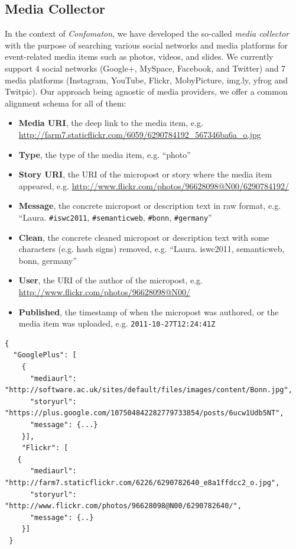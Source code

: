 \subsection{Media Collector}                                                \label{sec:media-collector}
In the context of \emph{Confomaton}, we have developed the so-called \emph{media collector} with the purpose of searching various social networks and media platforms for event-related media items such as photos, videos, and slides. We currently support 4 social networks (Google+, MySpace, Facebook, and Twitter) and 7 media platforms (Instagram, YouTube, Flickr, MobyPicture, img.ly, yfrog and Twitpic). Our approach being agnostic of media providers, we offer a common alignment schema for all of them:
\begin{itemize}
  \item	\textbf{Media URI}, the deep link to the media item, e.g. \url{http://farm7.staticflickr.com/6059/6290784192_567346ba6a_o.jpg}
  \item \textbf{Type}, the type of the media item, e.g.  ``photo''
  \item \textbf{Story URI}, the URI of the micropost or story where the media item appeared, e.g. \url{http://www.flickr.com/photos/96628098@N00/6290784192/}
  \item \textbf{Message}, the concrete micropost or description text in raw format, e.g.  ``Laura. \texttt{\#iswc2011}, \texttt{\#semanticweb}, \texttt{\#bonn}, \texttt{\#germany}''
  \item \textbf{Clean}, the concrete cleaned micropost or description text with some characters (e.g. hash signs) removed, e.g. ``Laura. iswc2011, semanticweb, bonn, germany''
  \item \textbf{User}, the URI of the author of the micropost, e.g. \url{http://www.flickr.com/photos/96628098@N00/}
  \item \textbf{Published}, the timestamp of when the micropost was authored, or the media item was uploaded, e.g. \texttt{2011-10-27T12:24:41Z}
\end{itemize}

\begin{lstlisting}[caption={Sample output of the media collector showing Google+ and Flickr results using \#iswc2011 as query term},label={lst:media}]
{
  "GooglePlus": [
    {
	  "mediaurl": "http://software.ac.uk/sites/default/files/images/content/Bonn.jpg",
	  "storyurl": "https://plus.google.com/107504842282779733854/posts/6ucw1Udb5NT",
	  "message": {...}
    }],
    "Flickr": [
   {
      "mediaurl": "http://farm7.staticflickr.com/6226/6290782640_e8a1ffdcc2_o.jpg",
      "storyurl": "http://www.flickr.com/photos/96628098@N00/6290782640/",
      "message": {..}
    }]
 }
\end{lstlisting}

